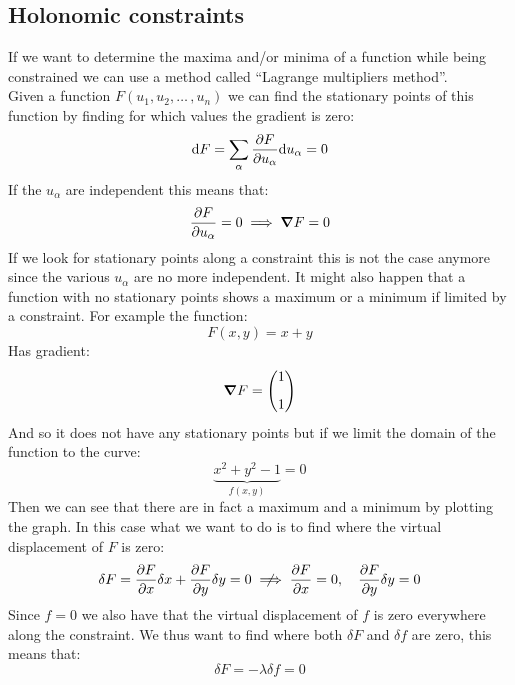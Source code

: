\subsection{Holonomic constraints}
If we want to determine the maxima and/or minima of a function while being constrained we can use a method called ``Lagrange multipliers method''.\\
Given a function $F(u_1, u_2, \dots\,,u_n)$ we can find the stationary points of this function by finding for which values the gradient is zero:
\begin{equation}
  \diff{F} = \bigsum_{\alpha} \pdv{F}{u_{\alpha}}\diff{u_{\alpha}} = 0
\end{equation}
If the $u_\alpha$ are independent this means that:
\begin{equation}
  \pdv{F}{u_{\alpha}} = 0 \implies \grad{F} = 0
\end{equation}
If we look for stationary points along a constraint this is not the case anymore since the various $u_{\alpha}$ are no more independent. It might also happen that a function with no stationary points shows a maximum or a minimum if limited by a constraint. For example the function:
\begin{equation}
  F(x,y) = x + y
\end{equation}
Has gradient:
\begin{equation}
  \grad{F} = \begin{pmatrix}
    1 \\[8pt]
    1
  \end{pmatrix}
\end{equation}
And so it does not have any stationary points but if we limit the domain of the function to the curve:
\begin{equation}
  \underbrace{x^2 + y^2 - 1}_{f(x,y)} = 0
\end{equation}
Then we can see that there are in fact a maximum and a minimum by plotting the graph. In this case what we want to do is to find where the virtual displacement of $F$ is zero:
\begin{equation}
  \delta F = \pdv{F}{x}\delta x + \pdv{F}{y}\delta y = 0 \notimplies \pdv{F}{x} = 0, \quad \pdv{F}{y}\delta y = 0
\end{equation}
Since $f = 0$ we also have that the virtual displacement of $f$ is zero everywhere along the constraint. We thus want to find where both $\delta F$ and $\delta f$ are zero, this means that:
\begin{equation}
  \delta F = - \lambda \delta f = 0
\end{equation}
